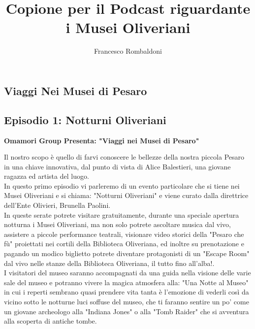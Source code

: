 \documentclass[hidelinks,12pt,a4paper]{article}
\begin{document}
	\begin{flushleft}
		
		\title{\textbf{Copione per il Podcast riguardante i Musei Oliveriani}}
		\author{Francesco Rombaldoni}
		\date{}
		
		\maketitle
		
		\setcounter{page}{1}
		\newpage
		
		\tableofcontents
		\newpage
		
		
		\section{Viaggi Nei Musei di Pesaro}
		\subsection{Episodio 1: Notturni Oliveriani}
		\begin{center}
			\textbf{Omamori Group Presenta: "Viaggi nei Musei di Pesaro"}
		\end{center}
		Il nostro scopo è quello di farvi conoscere le bellezze della nostra piccola Pesaro in una chiave innovativa, dal punto di vista di Alice Balestieri, una giovane ragazza ed artista del luogo.\\
		In questo primo episodio vi parleremo di un evento particolare che si tiene nei Musei Oliveriani e si chiama: "Notturni Oliveriani" e viene curato dalla direttrice dell'Ente Olivieri, Brunella Paolini.\\
		In queste serate potrete visitare gratuitamente, durante una speciale apertura notturna i Musei Oliveriani, ma non solo potrete ascoltare musica dal vivo, assistere a piccole performance teatrali, visionare video storici della "Pesaro che fù" proiettati nei cortili della Biblioteca Oliveriana, ed inoltre su prenotazione e pagando un modico biglietto potrete diventare protagonisti di un "Escape Room" dal vivo nelle stanze della Biblioteca Oliveriana, il tutto fino all'alba!.\\
		I visitatori del museo saranno accompagnati da una guida nella visione delle varie sale del museo e potranno vivere la magica atmosfera alla: "Una Notte al Museo" in cui i reperti sembrano quasi prendere vita tanta è l'emozione di vederli così da vicino sotto le notturne luci soffuse del museo, che ti faranno sentire un po' come un giovane archeologo alla "Indiana Jones" o alla "Tomb Raider" che si avventura alla scoperta di antiche tombe.\\

\end{flushleft}
\end{document}
